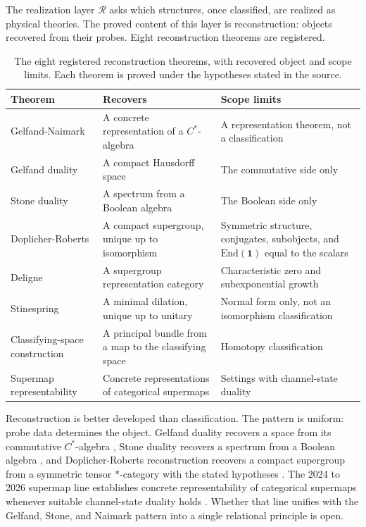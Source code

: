\documentclass[11pt,letterpaper]{article}
\theoremstyle{definition}
\begin{document}
The realization layer $\mathcal{R}$ asks which structures, once classified, are realized as physical theories. The proved content of this layer is reconstruction: objects recovered from their probes. Eight reconstruction theorems are registered.

\begin{table}[htbp]
\caption{The eight registered reconstruction theorems, with recovered object and scope limits. Each theorem is proved under the hypotheses stated in the source.}
\label{tab:reconstruction}
\small
\begin{tabularx}{\textwidth}{>{\hsize=0.70\hsize\raggedright\arraybackslash}X >{\hsize=1.12\hsize\raggedright\arraybackslash}X >{\hsize=1.18\hsize\raggedright\arraybackslash}X}
\toprule
Theorem & Recovers & Scope limits \\
\midrule
Gelfand-Naimark \cite{corpus-9,corpus-42} & A concrete representation of a $C^*$-algebra & A representation theorem, not a classification \\
Gelfand duality \cite{corpus-42} & A compact Hausdorff space & The commutative side only \\
Stone duality \cite{corpus-44} & A spectrum from a Boolean algebra & The Boolean side only \\
Doplicher-Roberts \cite{corpus-12,corpus-15,corpus-16,corpus-67} & A compact supergroup, unique up to isomorphism & Symmetric structure, conjugates, subobjects, and $\mathrm{End}(\mathbf{1})$ equal to the scalars \\
Deligne \cite{corpus-13} & A supergroup representation category & Characteristic zero and subexponential growth \\
Stinespring \cite{corpus-10,corpus-11} & A minimal dilation, unique up to unitary & Normal form only, not an isomorphism classification \\
Classifying-space construction \cite{corpus-17,corpus-18} & A principal bundle from a map to the classifying space & Homotopy classification \\
Supermap representability \cite{corpus-40,corpus-41} & Concrete representations of categorical supermaps & Settings with channel-state duality \\
\bottomrule
\end{tabularx}
\end{table}

Reconstruction is better developed than classification. The pattern is uniform: probe data determines the object. Gelfand duality recovers a space from its commutative $C^*$-algebra \cite{corpus-42}, Stone duality recovers a spectrum from a Boolean algebra \cite{corpus-44}, and Doplicher-Roberts reconstruction recovers a compact supergroup from a symmetric tensor $*$-category with the stated hypotheses \cite{corpus-12,corpus-16}. The 2024 to 2026 supermap line establishes concrete representability of categorical supermaps whenever suitable channel-state duality holds \cite{corpus-40,corpus-41}. Whether that line unifies with the Gelfand, Stone, and Naimark pattern into a single relational principle is open.
\end{document}
